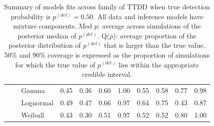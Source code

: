\documentclass[useAMS,usenatbib,referee,12pt]{article}
\newcommand{\pdet}{p^{(det)}}
\begin{document}
\begin{table}[ht]
\begin{tabular}{l|l|l|cccc|cccc}
\cline{2-11}
& \parbox[t]{2mm}{} & Gamma & 0.45 & 0.36 & 0.60 & 1.00 & 0.55 & 0.58 & 0.77 & 0.98 \\ 
   &  & Lognormal & 0.49 & 0.47 & 0.66 & 0.97 & 0.64 & 0.75 & 0.43 & 0.87 \\ 
   &  & Weibull & 0.43 & 0.30 & 0.51 & 0.97 & 0.52 & 0.52 & 0.80 & 1.00 \\ 
   \hline
\end{tabular}
\caption{Summary of models fits across family of TTDD when true detection probability is $\pdet = 0.50$.
All data and inference models have mixture components.
Med $p$: average across simulations of the posterior median of $\pdet$.  
Q($p$): average proportion of the posterior distribution of $\pdet$ that is larger than the true value.  
50\% and 90\% coverage is expressed as the proportion of simulations for which the true value of $\pdet$ lies within the appropriate credible interval.}
\label{tbl:fam50}

\vspace{0.5cm}


\end{table}
\end{document}
